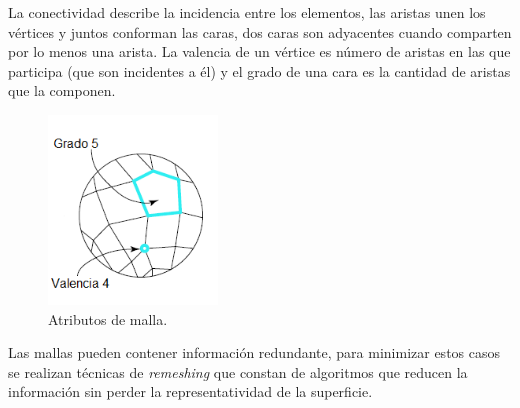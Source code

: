 La conectividad describe la incidencia entre los elementos, las aristas unen los vértices y juntos conforman las caras, dos caras son adyacentes cuando comparten por lo menos una arista. La valencia de un vértice es número de aristas en las que participa (que son incidentes a él) y el grado de una cara es la cantidad de aristas que la componen.
\begin{figure}[H]
  \centering
    \includegraphics[width=0.4\textwidth]{./Cap2_videomapping/MallaAtributos}
  \caption{Atributos de malla.}
  \label{fig:MallaAtributos}
\end{figure}
Las mallas pueden contener información redundante, para minimizar estos casos se realizan técnicas de \emph{remeshing} que constan de algoritmos que reducen la información sin perder la representatividad de la superficie.

